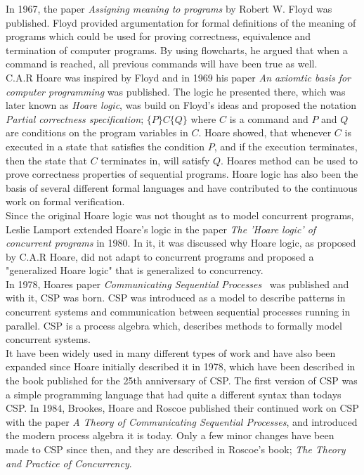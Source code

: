 In 1967, the paper \textit{Assigning meaning to programs}\cite{Floyd1967} by Robert W. Floyd was published. Floyd provided argumentation for formal definitions of the meaning of programs which could be used for proving correctness, equivalence and termination of computer programs. By using flowcharts, he argued that when a command is reached, all previous commands will have been true as well.\\ C.A.R Hoare was inspired by Floyd and in 1969 his paper \textit{An axiomtic basis for computer programming}\cite{Hoare1969} was published. The logic he presented there, which was later known as \textit{Hoare logic}, was build on Floyd's ideas and proposed the notation \textit{Partial correctness specification}; $\{P\} C \{Q\}$ where $C$ is a command and $P$ and $Q$ are conditions on the program variables in $C$. Hoare showed, that whenever $C$ is executed in a state that satisfies the condition $P$, and if the execution terminates, then the state that $C$ terminates in, will satisfy $Q$. Hoares method can be used to prove correctness properties of sequential programs. Hoare logic has also been the basis of several different formal languages and have contributed to the continuous work on formal verification. \\
Since the original Hoare logic was not thought as to model concurrent programs, Leslie Lamport extended Hoare's logic in the paper \textit{The 'Hoare logic' of concurrent programs}\cite{Lamport1980} in 1980. In it, it was discussed why Hoare logic, as proposed by C.A.R Hoare, did not adapt to concurrent programs and proposed a "generalized Hoare logic" that is generalized to concurrency. \\

In 1978, Hoares paper \textit{Communicating Sequential Processes}~\cite{Hoare1978} was published and with it, CSP was born.
CSP was introduced as a model to describe patterns in concurrent systems and communication between sequential processes running in parallel. CSP is a process algebra which, describes methods to formally model concurrent systems.\\
It have been widely used in many different types of work and have also been expanded since Hoare initially described it in 1978, which have been described in the book\cite{Abdallah2005} published for the 25th anniversary of CSP.
The first version of CSP was a simple programming language that had quite a different syntax than todays CSP. In 1984, Brookes, Hoare and Roscoe published their continued work on CSP with the paper \textit{A Theory of Communicating Sequential Processes}\cite{Brookes1984}, and introduced the modern process algebra it is today. Only a few minor changes have been made to CSP since then, and they are described in Roscoe's book; \textit{The Theory and Practice of Concurrency}\cite{Roscoe1997}.\\

